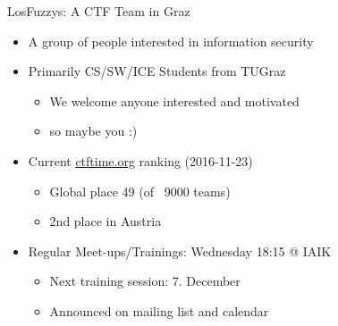 \begin{frame}
  {LosFuzzys: A CTF Team in Graz}

  \begin{itemize}
    \item A group of people interested in information security
    \item Primarily CS/SW/ICE Students from TUGraz
      \begin{itemize}
        \item We welcome anyone interested and motivated
        \item so maybe you :)
      \end{itemize}
    \item Current \href{https://ctftime.org/team/8323}{ctftime.org} ranking
      (2016-11-23)
      \begin{itemize}
        \item Global place 49 (of ~9000 teams)
        \item 2nd place in Austria
      \end{itemize}
    \item Regular Meet-ups/Trainings: Wednesday 18:15 @ IAIK
      \begin{itemize}
        \item Next training session: 7. December
        \item Announced on mailing list and calendar
      \end{itemize}
  \end{itemize}
\end{frame}


